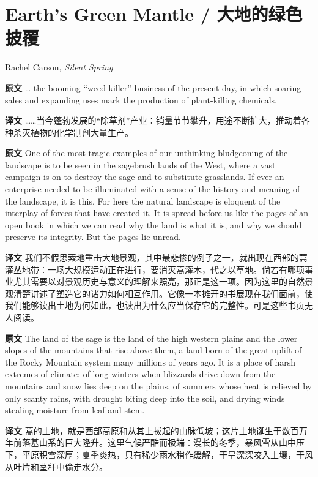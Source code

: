 \documentclass[UTF8,zihao=-4]{ctexart}
\begin{document}
\section*{Earth's Green Mantle / 大地的绿色披覆}
\begin{flushright}
Rachel Carson, \textit{Silent Spring}
\end{flushright}

\noindent\textbf{原文} \ldots{} the booming ``weed killer'' business of the present day, in which soaring sales and expanding uses mark the production of plant-killing chemicals.
\par
\noindent\textbf{译文} ……当今蓬勃发展的“除草剂”产业：销量节节攀升，用途不断扩大，推动着各种杀灭植物的化学制剂大量生产。
\par\medskip

\noindent\textbf{原文} One of the most tragic examples of our unthinking bludgeoning of the landscape is to be seen in the sagebrush lands of the West, where a vast campaign is on to destroy the sage and to substitute grasslands. If ever an enterprise needed to be illuminated with a sense of the history and meaning of the landscape, it is this. For here the natural landscape is eloquent of the interplay of forces that have created it. It is spread before us like the pages of an open book in which we can read why the land is what it is, and why we should preserve its integrity. But the pages lie unread.
\par
\noindent\textbf{译文} 我们不假思索地重击大地景观，其中最悲惨的例子之一，就出现在西部的蒿灌丛地带：一场大规模运动正在进行，要消灭蒿灌木，代之以草地。倘若有哪项事业尤其需要以对景观历史与意义的理解来照亮，那正是这一项。因为这里的自然景观清楚讲述了塑造它的诸力如何相互作用。它像一本摊开的书展现在我们面前，使我们能够读出土地为何如此，也读出为什么应当保存它的完整性。可是这些书页无人阅读。
\par\medskip

\noindent\textbf{原文} The land of the sage is the land of the high western plains and the lower slopes of the mountains that rise above them, a land born of the great uplift of the Rocky Mountain system many millions of years ago. It is a place of harsh extremes of climate: of long winters when blizzards drive down from the mountains and snow lies deep on the plains, of summers whose heat is relieved by only scanty rains, with drought biting deep into the soil, and drying winds stealing moisture from leaf and stem.
\par
\noindent\textbf{译文} 蒿的土地，就是西部高原和从其上拔起的山脉低坡；这片土地诞生于数百万年前落基山系的巨大隆升。这里气候严酷而极端：漫长的冬季，暴风雪从山中压下，平原积雪深厚；夏季炎热，只有稀少雨水稍作缓解，干旱深深咬入土壤，干风从叶片和茎秆中偷走水分。
\par\medskip
\end{document}
